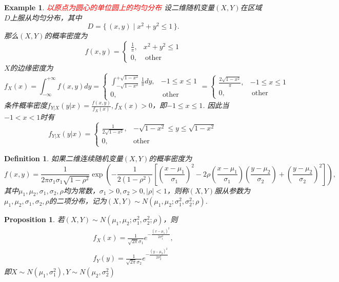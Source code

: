 \documentclass{article}
\newtheorem{proposition}[theorem]{Proposition}
\newtheorem{example}[theorem]{Example}
\newtheorem{definition}[theorem]{Definition}
\newcommand\Set[2]{\{\,#1\mid#2\,\}} %
\newcommand{\redt}[1]{\textcolor{red}{#1}}
\begin{document}
\begin{example}
\rm \redt{以原点为圆心的单位圆上的均匀分布} 设二维随机变量$(X,Y)$在区域$D$上服从均匀分布，其中
$$
D=\Set{(x,y)}{x^2 + y ^2 \leq 1}.
$$
那么$(X,Y)$的概率密度为
$$
f(x,y)=\left\{\begin{array}{ll}
\frac{1}{\pi}, & x^2 + y^2 \leq 1 \\
0, & ~\text{other}
\end{array}\right. 
$$
$X$的边缘密度为
$$
f_X(x) = \int_{-\infty}^{+\infty} f(x,y)dy = \left\{ \begin{array}{ll}
\int_{-\sqrt{1-x^2}}^{+\sqrt{1-x^2}} \frac{1}{\pi}dy, & -1 \leq x \leq 1\\
0, & ~\text{other} 
\end{array} \right. = \left\{\begin{array}{ll}
\frac{2\sqrt{1-x^2}}{\pi},& -1 \leq x \leq 1 \\
0, & ~\text{other}
\end{array} \right.
$$
条件概率密度$f_{Y|X}(y|x) = \frac{f(x,y)}{f_X(x)}, f_X(x) > 0$，即$-1 \leq x \leq 1$. 因此当$-1<x<1$时有
$$
f_{Y|X}(y|x) = \left\{\begin{array}{ll}
\frac{1}{2\sqrt{1-x^2}}, &  -\sqrt{1-x^2} \leq y \leq \sqrt{1-x^2} \\
0, & \text{other}
\end{array}\right.
$$
\end{example}

\begin{definition}
\rm 如果二维连续随机变量$(X,Y)$的概率密度为
\begin{equation}
f(x,y)={\frac {1}{2\pi \sigma _{1}\sigma _{1}{\sqrt {1-\rho ^{2}}}}}\mathrm \exp\left({-{\frac {1}{2(1-\rho ^{2})}}\left[\left({\frac {x-\mu _{1}}{\sigma _{1}}}\right)^{2}-2\rho \left({\frac {x-\mu _{1}}{\sigma _{1}}}\right)\left({\frac {y-\mu _{2}}{\sigma _{2}}}\right)+\left({\frac {y-\mu _{2}}{\sigma _{2}}}\right)^{2}\right]}\right),
\end{equation}
其中$\mu_1,\mu_2,\sigma_1,\sigma_2,\rho$均为常数，$\sigma_1 > 0,\sigma_2 > 0, |\rho| < 1$，则称$(X,Y)$服从参数为$\mu_1,\mu_2,\sigma_1,\sigma_2,\rho$的二项分布，记为$(X,Y) \sim N(\mu_1,\mu_2;\sigma_1^2,\sigma_2^2; \rho)$. 
\end{definition}

\begin{proposition}
\rm 若$(X,Y) \sim N(\mu_1,\mu_2;\sigma_1^2,\sigma_2^2; \rho)$，则
$$
\begin{array}{ll}
f_X(x) = \frac{1}{\sqrt{2\pi}\sigma_1}e^{-\frac{(x-\mu_1)^2}{2\sigma_1^2}}, \\
f_Y(y) = \frac{1}{\sqrt{2\pi}\sigma_2}e^{-\frac{(y-\mu_2)^2}{2\sigma_2^2}}
\end{array}
$$
即$X \sim N(\mu_1,\sigma_1^2),Y \sim N(\mu_2,\sigma_2^2)$
\end{proposition}
\end{document}
